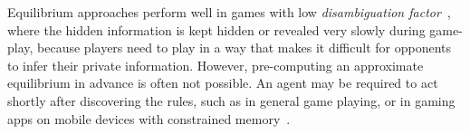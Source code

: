 \documentclass[letterpaper]{article}
\begin{document}

Equilibrium approaches perform well in games with low {\it disambiguation factor}~\cite{Long10Understanding}, 
where the hidden information is kept hidden or revealed very slowly during game-play, because players need to play in a way
that makes it difficult for opponents to infer their private information. 
However, pre-computing an approximate equilibrium in advance is often not possible. 
An agent may be required to 
act shortly after discovering the rules, such as in general game playing, 
or in gaming apps on mobile devices with constrained memory~\cite{Whitehouse13Integrating}.

\end{document}
